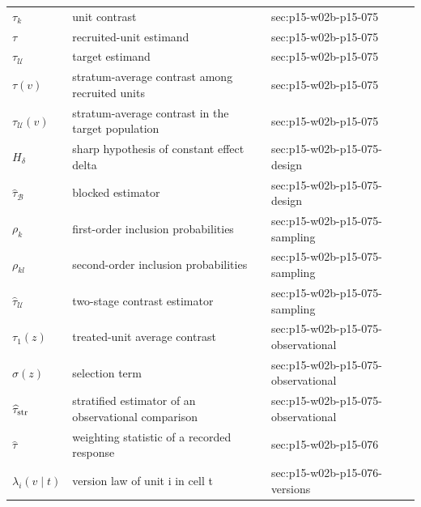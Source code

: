 \begin{longtable}{@{}p{}p{}p{}@{}}
\(\tau_k\) & unit contrast & sec:\allowbreak{}p15-\allowbreak{}w02b-\allowbreak{}p15-\allowbreak{}075 \\
\(\tau\) & recruited-unit estimand & sec:\allowbreak{}p15-\allowbreak{}w02b-\allowbreak{}p15-\allowbreak{}075 \\
\(\tau_{\mathcal U}\) & target estimand & sec:\allowbreak{}p15-\allowbreak{}w02b-\allowbreak{}p15-\allowbreak{}075 \\
\(\tau(v)\) & stratum-average contrast among recruited units & sec:\allowbreak{}p15-\allowbreak{}w02b-\allowbreak{}p15-\allowbreak{}075 \\
\(\tau_{\mathcal U}(v)\) & stratum-average contrast in the target population & sec:\allowbreak{}p15-\allowbreak{}w02b-\allowbreak{}p15-\allowbreak{}075 \\
\(H_\delta\) & sharp hypothesis of constant effect delta & sec:\allowbreak{}p15-\allowbreak{}w02b-\allowbreak{}p15-\allowbreak{}075-\allowbreak{}design \\
\(\widehat\tau_{\mathcal B}\) & blocked estimator & sec:\allowbreak{}p15-\allowbreak{}w02b-\allowbreak{}p15-\allowbreak{}075-\allowbreak{}design \\
\(\rho_k\) & first-order inclusion probabilities & sec:\allowbreak{}p15-\allowbreak{}w02b-\allowbreak{}p15-\allowbreak{}075-\allowbreak{}sampling \\
\(\rho_{kl}\) & second-order inclusion probabilities & sec:\allowbreak{}p15-\allowbreak{}w02b-\allowbreak{}p15-\allowbreak{}075-\allowbreak{}sampling \\
\(\widehat\tau_{\mathcal U}\) & two-stage contrast estimator & sec:\allowbreak{}p15-\allowbreak{}w02b-\allowbreak{}p15-\allowbreak{}075-\allowbreak{}sampling \\
\(\tau_1(z)\) & treated-unit average contrast & sec:\allowbreak{}p15-\allowbreak{}w02b-\allowbreak{}p15-\allowbreak{}075-\allowbreak{}observational \\
\(\sigma(z)\) & selection term & sec:\allowbreak{}p15-\allowbreak{}w02b-\allowbreak{}p15-\allowbreak{}075-\allowbreak{}observational \\
\(\widehat\tau_{\rm str}\) & stratified estimator of an observational comparison & sec:\allowbreak{}p15-\allowbreak{}w02b-\allowbreak{}p15-\allowbreak{}075-\allowbreak{}observational \\
\(\widehat\tau\) & weighting statistic of a recorded response & sec:\allowbreak{}p15-\allowbreak{}w02b-\allowbreak{}p15-\allowbreak{}076 \\
\(\lambda_i(v\mid t)\) & version law of unit i in cell t & sec:\allowbreak{}p15-\allowbreak{}w02b-\allowbreak{}p15-\allowbreak{}076-\allowbreak{}versions \\

\end{longtable}
